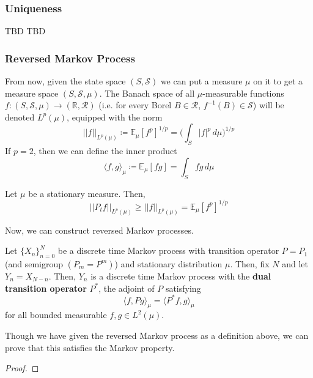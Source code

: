 \documentclass{article}
\begin{document}
    \subsubsection{Uniqueness}

      TBD
      TBD

    \subsubsection{Reversed Markov Process}

      From now, given the state space $(S, \mathcal{S})$ we can put a measure $\mu$ on it to get a measure space $(S, \mathcal{S}, \mu)$. The Banach space of all $\mu$-measurable functions $f: (S, \mathcal{S}, \mu) \rightarrow (\mathbb{R}, \mathcal{R})$ (i.e. for every Borel $B \in \mathcal{R}$, $f^{-1}(B) \in \mathcal{S}$) will be denoted $L^p (\mu)$, equipped with the norm 
      \[||f||_{L^p(\mu)} \coloneqq \mathbb{E}_\mu [f^p]^{1/p} = \bigg( \int_S |f|^p \,d\mu \bigg)^{1/p}\]
      If $p = 2$, then we can define the inner product 
      \[\langle f, g \rangle_\mu \coloneqq \mathbb{E}_\mu [f g] = \int_S f g \, d\mu\]

      \begin{lemma}
      Let $\mu$ be a stationary measure. Then, 
      \[||P_t f||_{L^p(\mu)} \geq ||f||_{L^p (\mu)} = \mathbb{E}_\mu [f^p]^{1/p}\]
      \end{lemma}

      Now, we can construct reversed Markov processes. 

      \begin{definition}
      Let $\{X_n\}_{n=0}^N$ be a discrete time Markov process with transition operator $P = P_1$ (and semigroup $(P_m = P^m)$) and stationary distribution $\mu$. Then, fix $N$ and let $Y_n = X_{N - n}$. Then, $Y_n$ is a discrete time Markov process with the \textbf{dual transition operator} $P^*$, the adjoint of $P$ satisfying 
      \[\langle f, P g \rangle_\mu = \langle P^* f, g \rangle_\mu\]
      for all bounded measurable $f, g \in L^2 (\mu)$. 
      \end{definition}

      Though we have given the reversed Markov process as a definition above, we can prove that this satisfies the Markov property. 

      \begin{proof}

      \end{proof}
\end{document}
